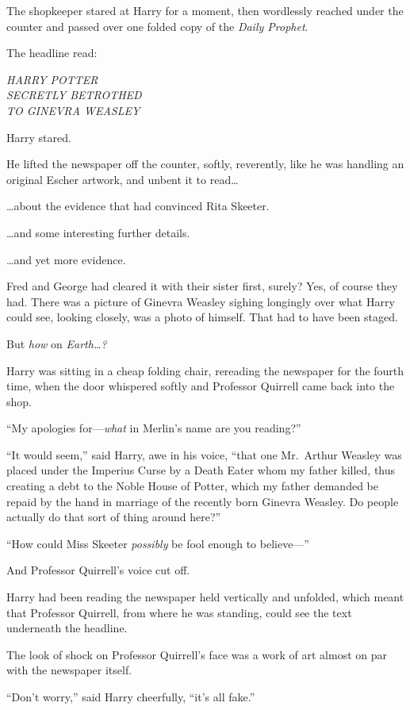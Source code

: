 The shopkeeper stared at Harry for a moment, then wordlessly reached
under the counter and passed over one folded copy of the \emph{Daily
Prophet}.

The headline read:

\emph{HARRY POTTER}\\\emph{SECRETLY BETROTHED}\\\emph{TO GINEVRA
WEASLEY}

Harry stared.

He lifted the newspaper off the counter, softly, reverently, like he was
handling an original Escher artwork, and unbent it to read\ldots{}

\ldots{}about the evidence that had convinced Rita Skeeter.

\ldots{}and some interesting further details.

\ldots{}and yet more evidence.

Fred and George had cleared it with their sister first, surely? Yes, of
course they had. There was a picture of Ginevra Weasley sighing
longingly over what Harry could see, looking closely, was a photo of
himself. That had to have been staged.

But \emph{how} on \emph{Earth\ldots{}?}

Harry was sitting in a cheap folding chair, rereading the newspaper for
the fourth time, when the door whispered softly and Professor Quirrell
came back into the shop.

``My apologies for---\emph{what} in Merlin's name are you reading?''

``It would seem,'' said Harry, awe in his voice, ``that one Mr.~Arthur
Weasley was placed under the Imperius Curse by a Death Eater whom my
father killed, thus creating a debt to the Noble House of Potter, which
my father demanded be repaid by the hand in marriage of the recently
born Ginevra Weasley. Do people actually do that sort of thing around
here?''

``How could Miss Skeeter \emph{possibly} be fool enough to believe---''

And Professor Quirrell's voice cut off.

Harry had been reading the newspaper held vertically and unfolded, which
meant that Professor Quirrell, from where he was standing, could see the
text underneath the headline.

The look of shock on Professor Quirrell's face was a work of art almost
on par with the newspaper itself.

``Don't worry,'' said Harry cheerfully, ``it's all fake.''

